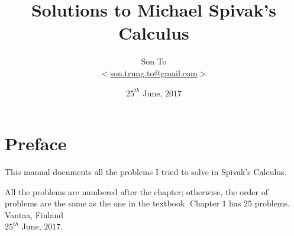 \documentclass[a4paper,11pt]{memoir}
\newcommand{\note}[1]{\emph{#1}}
\theoremstyle{plain} \newtheorem{id}{Lemma}[chapter]
\theoremstyle{definition} \newtheorem{pr}{Problem}[chapter]
\theoremstyle{remark}\newtheorem{ab}{Remark}[chapter]
\begin{document}
  \title{Solutions to Michael Spivak's Calculus}
  \author{Son To\\
  $<$\href{mailto:son.trung.to@gmail.com}%
  {son.trung.to@gmail.com}$>$}
  \date{$25^{th}$ June, $2017$}

  \maketitle
  \makeatletter
  \def\cleardoublepage{\clearpage\if@twoside
  \ifodd\c@page\else
    \hbox{}
    \vspace*{\fill}
    \begin{center}
      \doublenote
    \end{center}
    \vspace*{\fill}
    \thispagestyle{empty}
    \newpage
    \if@twocolumn\hbox{}\newpage\fi\fi\fi
}
\newcommand{\mylabel}[2]{#2\def\@currentlabel{#2}\label{#1}}
\def\@endpart{\vfill\newpage
              \if@twoside
                \if@openright
                  \null
                  \thispagestyle{empty}%
\vspace*{\fill}%
\begin{quote}%
  \partnote
\end{quote}%
\vspace*{\fill}%
                  \newpage
                \fi
              \fi
              \if@tempswa
                \twocolumn
              \fi
}
\newcommand{\partnote}{}
\newcommand{\doublenote}{}

\newcommand\binomialCoefficient[2]{%
  \c@pgf@counta=#1 %
  \c@pgf@countb=#2 %
  \c@pgf@countc=\c@pgf@counta%
  \advance \c@pgf@countc by-\c@pgf@countb%
  \ifnum\c@pgf@countb>\c@pgf@countc%
    \c@pgf@countb=\c@pgf@countc%
  \fi%
  \c@pgf@countc=1 %
  \c@pgf@countd=0 %
  \pgfmathloop %
    \ifnum\c@pgf@countd<\c@pgf@countb%
    \multiply \c@pgf@countc by\c@pgf@counta%
    \advance  \c@pgf@counta by-1%
    \advance  \c@pgf@countd by1%
    \divide   \c@pgf@countc by\c@pgf@countd%
  \repeatpgfmathloop%
  \the\c@pgf@countc%
}
\makeatother

\renewcommand{\doublenote}{%
\note{On maailmalle}}
\frontmatter
  \chapter{Preface}
    This manual documents all the problems I tried to solve in Spivak's
    Calculus.
    \par
    All the problems are numbered after the chapter;
    otherwise, the order of problems are the same as
    the one in the textbook.
    Chapter $1$ has $25$ problems.
    \flushright
    Vantaa, Finland \\
    $25^{th}$ June, $2017$.
  \clearpage
  \tableofcontents
\end{document}
